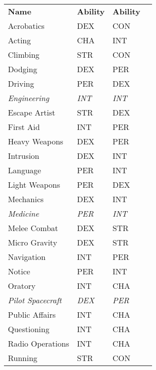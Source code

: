 \documentclass[8pt,landscape,a4paper]{article}
\begin{document}
\begin{multicols}{4}
\begin{center}
  \begin{tabular}{llll}
\textbf{Name}             & \textbf{Ability} &  \textbf{Ability} &  \\
Acrobatics                & DEX          & CON          &  \\
Acting                    & CHA          & INT          &  \\
Climbing                  & STR          & CON          &  \\
Dodging                   & DEX          & PER          &  \\
Driving                   & PER          & DEX          &  \\
\textit{Engineering}      & \textit{INT} & \textit{INT} &  \\
Escape Artist             & STR          & DEX          &  \\
First Aid                 & INT          & PER          &  \\
Heavy Weapons             & DEX          & PER          &  \\
Intrusion                 & DEX          & INT          &  \\
Language                  & PER          & INT          &  \\
Light Weapons             & PER          & DEX          &  \\
Mechanics                 & DEX          & INT          &  \\
\textit{Medicine}         & \textit{PER} & \textit{INT} &  \\
Melee Combat              & DEX          & STR          &  \\
Micro Gravity             & DEX          & STR          &  \\
Navigation                & INT          & PER          &  \\
Notice                    & PER          & INT          &  \\
Oratory                   & INT          & CHA          &  \\
\textit{Pilot Spacecraft} & \textit{DEX} & \textit{PER} &  \\
Public Affairs            & INT          & CHA          &  \\
Questioning               & INT          & CHA          &  \\
Radio Operations          & INT          & CHA          &  \\
Running                   & STR          & CON          &  \\

\end{tabular}
\end{center}
\end{multicols}
\end{document}
